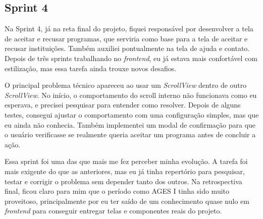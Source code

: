 \subsection{Sprint 4}

Na Sprint 4, já na reta final do projeto, fiquei responsável por desenvolver a tela de aceitar e recusar programas, que serviria como base para a tela de aceitar e recusar instituições. Também auxiliei pontualmente na tela de ajuda e contato. Depois de três sprints trabalhando no \textit{frontend}, eu já estava mais confortável com estilização, mas essa tarefa ainda trouxe novos desafios.

O principal problema técnico apareceu ao usar um \textit{ScrollView} dentro de outro \textit{ScrollView}. No início, o comportamento do scroll interno não funcionava como eu esperava, e precisei pesquisar para entender como resolver. Depois de alguns testes, consegui ajustar o comportamento com uma configuração simples, mas que eu ainda não conhecia. Também implementei um modal de confirmação para que o usuário verificasse se realmente queria aceitar um programa antes de concluir a ação.

Essa sprint foi uma das que mais me fez perceber minha evolução. A tarefa foi mais exigente do que as anteriores, mas eu já tinha repertório para pesquisar, testar e corrigir o problema sem depender tanto dos outros. Na retrospectiva final, ficou claro para mim que o período como AGES I tinha sido muito proveitoso, principalmente por eu ter saído de um conhecimento quase nulo em \textit{frontend} para conseguir entregar telas e componentes reais do projeto.
